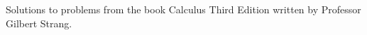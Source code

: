 \documentclass{article}
\begin{document}
Solutions to problems from the book Calculus Third Edition written by Professor Gilbert Strang.
\end{document}
